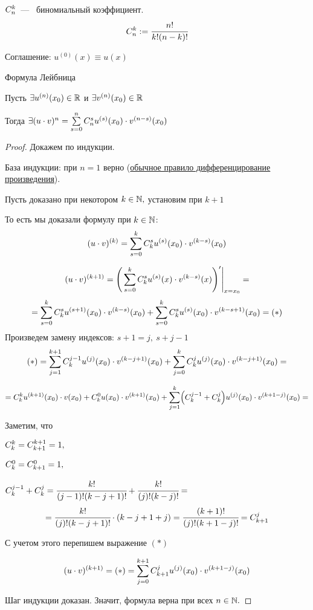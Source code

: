 $ \relax C_{n}^{k}$~---~ биномиальный коэффициент.
$$ \relax C_{n}^{k} := \cfrac{n!}{k!(n-k)!}$$

Соглашение: $u^{(0)}(x) \equiv u(x)$

\begin{theorem} \hypertarget{thrm5.8}{Формула Лейбница}
    Пусть $\exists u^{(n)}(x_{0}) \in \mathbb{R} $ и $\exists v^{(n)}(x_{0}) \in \mathbb{R}$

    Тогда $\exists (u\cdot v)^{n} = \sum\limits_{s=0}^{n} \relax C_{n}^{s} u^{(s)}(x_{0}) \cdot v^{(n-s)}(x_{0})$
\end{theorem}
\begin{proof}
    Докажем по индукции.

    База индукции: при $n =1 $ верно (\hyperlink{thrm5.3}{обычное правило дифференцирование произведения}).

    Пусть доказано при некотором $k \in \mathbb{N},$ установим при $k + 1$

    То есть мы доказали формулу при $k \in \mathbb{N}$:
    $$(u \cdot v)^{(k)} = \sum\limits_{s=0}^{k} \relax C_{k}^{s} u^{(s)}(x_{0}) \cdot v^{(k-s)}(x_{0}) $$

    $$
    (u \cdot v)^{(k+1)} = \Bigg(\sum\limits_{s=0}^{k} \relax C_{k}^{s} u^{(s)}(x) \cdot v^{(k-s)}(x) \Bigg)' \Bigg|_{x=x_{0}} = 
    $$
    $$ =\sum\limits_{s=0}^{k} \relax C_{k}^{s} u^{(s+1)}(x_{0}) \cdot v^{(k-s)}(x_{0}) + \sum\limits_{s=0}^{k} \relax C_{k}^{s} u^{(s)}(x_{0}) \cdot v^{(k-s + 1)}(x_{0}) = (*)
    $$
     Произведем замену индексов: $ s + 1 = j, \ s+ j - 1$
    $$
    (*) = \sum\limits_{j=1}^{k+1} \relax C_{k}^{j-1} u^{(j)}(x_{0}) \cdot v^{(k-j + 1)}(x_{0}) + \sum\limits_{j=0}^{k} \relax C_{k}^{j} u^{(j)}(x_{0}) \cdot v^{(k-j + 1)}(x_{0}) =
    $$

    $$
    =  \relax C_{k}^{k} u^{(k+1)}(x_{0}) \cdot v(x_{0}) + \relax C_{k}^{0} u(x_{0}) \cdot v^{(k+ 1)}(x_{0}) + \sum\limits_{j=1}^{k} \Bigl(\relax C_{k}^{j-1} + \relax C_{k}^{j} \Bigr) u^{(j)}(x_{0}) \cdot v^{(k+1 -j)}(x_{0}) = 
    $$

    Заметим, что
    
    $
    \relax C_{k}^{k} = \relax C_{k+1}^{k+1} = 1,$
    
    $\relax C_{k}^{0} = \relax C_{k + 1}^{0} = 1,
    $
    
    $
    \relax C_{k}^{j-1} +  \relax C_{k}^{j} = \cfrac{k!}{(j-1)!(k-j + 1)!} + \cfrac{k!}{(j)!(k-j)!} =
    $
    $$
    = \cfrac{k!}{(j)!(k-j+1)!} \cdot ( k -j + 1 + j) = \cfrac{(k+1)!}{(j)!(k+1-j)!} = C_{k+1}^{j}
    $$

    С учетом этого перепишем выражение $(*)$

    $$
    (u \cdot v)^{(k+1)} = (*) = \sum\limits_{j=0}^{k+1} \relax C_{k+1}^{j} u^{(j)}(x_{0}) \cdot v^{(k+1-j)}(x_{0})
    $$

    Шаг индукции доказан. Значит, формула верна при всех $n \in \mathbb{N}.$
\end{proof}